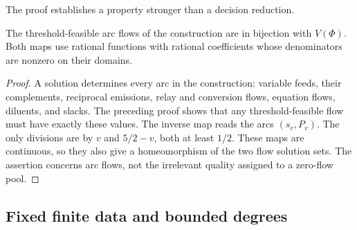The proof establishes a property stronger than a decision reduction.
\begin{lemma}\label{s2:bijection}
The threshold-feasible arc flows of the construction are in bijection
with $V(\Phi)$. Both maps use rational functions with rational
coefficients whose denominators are nonzero on their domains.
\end{lemma}
\begin{proof}
A solution determines every arc in the construction: variable feeds,
their complements, reciprocal emissions, relay and conversion flows,
equation flows, diluents, and slacks. The preceding proof shows that any
threshold-feasible flow must have exactly these values. The inverse
map reads the arcs $(s_v,P_v)$. The only divisions are by $v$ and
$5/2-v$, both at least $1/2$. These maps are continuous, so they also
give a homeomorphism of the two flow solution sets. The assertion concerns
arc flows, not the irrelevant quality assigned to a zero-flow pool.
\end{proof}

\subsection{Fixed finite data and bounded degrees}\label{s2:finite-data}

